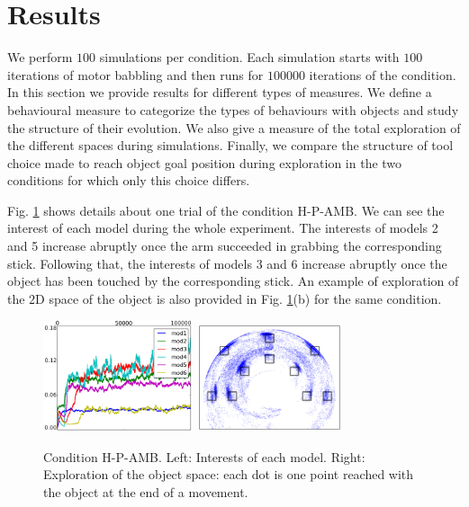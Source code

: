\documentclass[10pt,letterpaper]{article}
\begin{document}
	
%


\section{Results}
	
	We perform $100$ simulations per condition. 
	Each simulation starts with $100$ iterations of motor babbling and then runs for $100000$ iterations of the condition.
	In this section we provide results for different types of measures. 
	We define a behavioural measure to categorize the types of behaviours with objects and study the structure of their evolution.
	We also give a measure of the total exploration of the different spaces during simulations.
	Finally, we compare the structure of tool choice made to reach object goal position during exploration in the two conditions for which only this choice differs.
		
	Fig. \ref{res_interests} shows details about one trial of the condition H-P-AMB. 
	We can see the interest of each model during the whole experiment.
	The interests of models 2 and 5 increase abruptly once the arm succeeded in grabbing the corresponding stick.
	Following that, the interests of models 3 and 6 increase abruptly once the object has been touched by the corresponding stick.
	An example of exploration of the $2$D space of the object is also provided in Fig. \ref{res_interests}(b) for the same condition.
	
	\begin{figure}[ht]
		\centering
		\hspace{-0.7cm}	
		\vspace{0pt}
		\includegraphics[width=4.4cm]{./include/H-RGB-P-AMB-log9-interests-100000.png}
		\hspace{-0.1cm}	
		\vspace{0pt}
		\includegraphics[width=4.26cm]{./include/obj-explo.pdf}
		\caption{Condition H-P-AMB. Left: Interests of each model. Right: Exploration of the object space: each dot is one point reached with the object at the end of a movement.}
		\label{res_interests}
	\end{figure}
\end{document}
